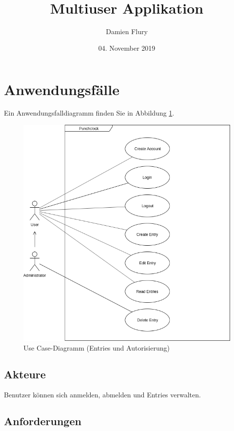 \documentclass[a4paper, titlepage]{article}
\title{Multiuser Applikation}
\author{Damien Flury}
\date{04. November 2019}
\begin{document}
    \maketitle

    \tableofcontents
    \newpage

    \section{Anwendungsfälle}
    Ein Anwendungsfalldiagramm finden Sie in Abbildung \ref{usecase}.

    \begin{figure}
        \includegraphics[width=\textwidth]{images/UseCaseDiagram.png}
        \caption{Use Case-Diagramm (Entries und Autorisierung)}
        \label{usecase}
    \end{figure}
    \subsection{Akteure}
    Benutzer können sich anmelden, abmelden und Entries verwalten.

    \subsection{Anforderungen}
\end{document}
